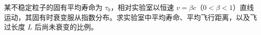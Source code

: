 某不稳定粒子的固有平均寿命为 $\tau_0$，相对实验室以恒速 $v=\beta c$（$0<\beta<1$）直线运动，其固有时衰变服从指数分布。求实验室中平均寿命、平均飞行距离，以及飞过长度 $L$ 后尚未衰变的比例。
